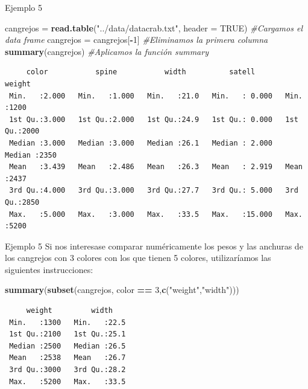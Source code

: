 \documentclass[
  ignorenonframetext,
]{beamer}
\newenvironment{Shaded}{\begin{snugshade}}{\end{snugshade}}
\newcommand{\AttributeTok}[1]{\textcolor[rgb]{0.13,0.29,0.53}{#1}}
\newcommand{\CommentTok}[1]{\textcolor[rgb]{0.56,0.35,0.01}{\textit{#1}}}
\newcommand{\ConstantTok}[1]{\textcolor[rgb]{0.56,0.35,0.01}{#1}}
\newcommand{\DecValTok}[1]{\textcolor[rgb]{0.00,0.00,0.81}{#1}}
\newcommand{\FunctionTok}[1]{\textcolor[rgb]{0.13,0.29,0.53}{\textbf{#1}}}
\newcommand{\NormalTok}[1]{#1}
\newcommand{\OtherTok}[1]{\textcolor[rgb]{0.56,0.35,0.01}{#1}}
\newcommand{\SpecialCharTok}[1]{\textcolor[rgb]{0.81,0.36,0.00}{\textbf{#1}}}
\newcommand{\StringTok}[1]{\textcolor[rgb]{0.31,0.60,0.02}{#1}}
\begin{document}
\begin{frame}[fragile]{Ejemplo 5}
\label{ejemplo-5-18}
\begin{Shaded}
\begin{Highlighting}[]
\NormalTok{cangrejos }\OtherTok{=} \FunctionTok{read.table}\NormalTok{(}\StringTok{"../data/datacrab.txt"}\NormalTok{, }\AttributeTok{header =} \ConstantTok{TRUE}\NormalTok{) }\CommentTok{\#Cargamos el data frame}
\NormalTok{cangrejos }\OtherTok{=}\NormalTok{ cangrejos[}\SpecialCharTok{{-}}\DecValTok{1}\NormalTok{] }\CommentTok{\#Eliminamos la primera columna}
\FunctionTok{summary}\NormalTok{(cangrejos) }\CommentTok{\#Aplicamos la función summary}
\end{Highlighting}
\end{Shaded}

\begin{verbatim}
     color           spine           width          satell           weight    
 Min.   :2.000   Min.   :1.000   Min.   :21.0   Min.   : 0.000   Min.   :1200  
 1st Qu.:3.000   1st Qu.:2.000   1st Qu.:24.9   1st Qu.: 0.000   1st Qu.:2000  
 Median :3.000   Median :3.000   Median :26.1   Median : 2.000   Median :2350  
 Mean   :3.439   Mean   :2.486   Mean   :26.3   Mean   : 2.919   Mean   :2437  
 3rd Qu.:4.000   3rd Qu.:3.000   3rd Qu.:27.7   3rd Qu.: 5.000   3rd Qu.:2850  
 Max.   :5.000   Max.   :3.000   Max.   :33.5   Max.   :15.000   Max.   :5200  
\end{verbatim}
\end{frame}

\begin{frame}[fragile]{Ejemplo 5}
\label{ejemplo-5-19}
Si nos interesase comparar numéricamente los pesos y las anchuras de los
cangrejos con 3 colores con los que tienen 5 colores, utilizaríamos las
siguientes instrucciones:

\begin{Shaded}
\begin{Highlighting}[]
\FunctionTok{summary}\NormalTok{(}\FunctionTok{subset}\NormalTok{(cangrejos, color }\SpecialCharTok{==} \DecValTok{3}\NormalTok{,}\FunctionTok{c}\NormalTok{(}\StringTok{"weight"}\NormalTok{,}\StringTok{"width"}\NormalTok{)))}
\end{Highlighting}
\end{Shaded}

\begin{verbatim}
     weight         width     
 Min.   :1300   Min.   :22.5  
 1st Qu.:2100   1st Qu.:25.1  
 Median :2500   Median :26.5  
 Mean   :2538   Mean   :26.7  
 3rd Qu.:3000   3rd Qu.:28.2  
 Max.   :5200   Max.   :33.5  
\end{verbatim}
\end{frame}
\end{document}
